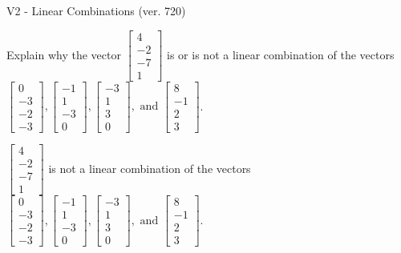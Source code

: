 \begin{exercise}
  \begin{exerciseTitle}V2 - Linear Combinations (ver. 720)\end{exerciseTitle}
  \begin{exerciseStatement}
    Explain why the vector \(\left[\begin{array}{c}
4 \\
-2 \\
-7 \\
1
\end{array}\right]\)  is or is not a linear 
	combination of the vectors \(\left[\begin{array}{c}
0 \\
-3 \\
-2 \\
-3
\end{array}\right] , \left[\begin{array}{c}
-1 \\
1 \\
-3 \\
0
\end{array}\right] , \left[\begin{array}{c}
-3 \\
1 \\
3 \\
0
\end{array}\right] , \text{ and } \left[\begin{array}{c}
8 \\
-1 \\
2 \\
3
\end{array}\right]\).
	


  \end{exerciseStatement}
  \begin{exerciseAnswer}
   \(\left[\begin{array}{c}
4 \\
-2 \\
-7 \\
1
\end{array}\right]\) 
  	 is not  
	a linear combination of the vectors \(\left[\begin{array}{c}
0 \\
-3 \\
-2 \\
-3
\end{array}\right] , \left[\begin{array}{c}
-1 \\
1 \\
-3 \\
0
\end{array}\right] , \left[\begin{array}{c}
-3 \\
1 \\
3 \\
0
\end{array}\right] , \text{ and } \left[\begin{array}{c}
8 \\
-1 \\
2 \\
3
\end{array}\right]\).


\end{exerciseAnswer}
\end{exercise}
